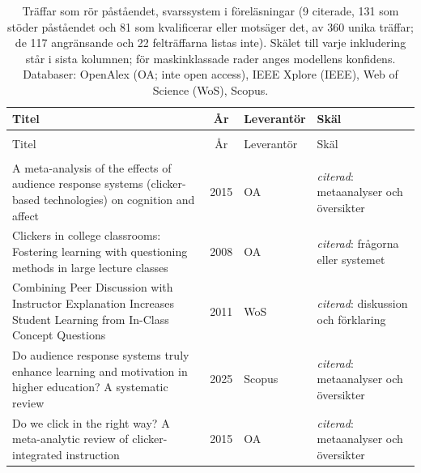 
\begingroup\footnotesize
\begin{longtable}{@{}%
  >{\raggedright\arraybackslash}p{}c%
  >{\raggedright\arraybackslash}p{}%
  >{\raggedright\arraybackslash}p{}@{}}
\caption{Träffar som rör påståendet, svarssystem i föreläsningar (9 citerade, 131 som stöder påståendet och 81 som kvalificerar eller motsäger det, av 360 unika träffar; de 117 angränsande och 22 felträffarna listas inte). Skälet till varje inkludering står i sista kolumnen; för maskinklassade rader anges modellens konfidens. Databaser: OpenAlex (OA; inte open access), IEEE Xplore (IEEE), Web of Science (WoS), Scopus.}\label{tab:sok-recap-clickers}\\
\toprule
Titel & År & Leverantör & Skäl \\
\midrule
\endfirsthead
\multicolumn{4}{@{}l}{\emph{\tablename~\thetable{} (forts.)}}\\
\toprule
Titel & År & Leverantör & Skäl \\
\midrule
\endhead
\midrule \multicolumn{4}{r@{}}{\emph{forts.\ på nästa sida}}\\
\endfoot
\bottomrule
\endlastfoot
A meta-analysis of the effects of audience response systems (clicker-based technologies) on cognition and affect & 2015 & OA & \emph{citerad}: metaanalyser och översikter \\
Clickers in college classrooms: Fostering learning with questioning methods in large lecture classes & 2008 & OA & \emph{citerad}: frågorna eller systemet \\
Combining Peer Discussion with Instructor Explanation Increases Student Learning from In-Class Concept Questions & 2011 & WoS & \emph{citerad}: diskussion och förklaring \\
Do audience response systems truly enhance learning and motivation in higher education? A systematic review & 2025 & Scopus & \emph{citerad}: metaanalyser och översikter \\
Do we click in the right way? A meta-analytic review of clicker-integrated instruction & 2015 & OA & \emph{citerad}: metaanalyser och översikter \\

\end{longtable}
